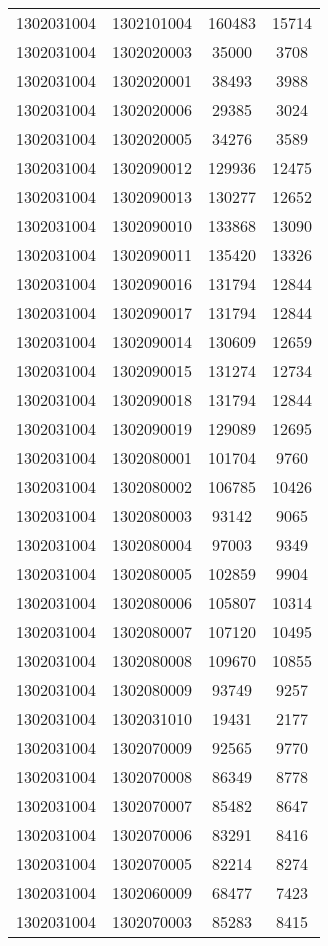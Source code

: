 \begin{longtable}{llcc}
1302031004 & 1302101004 & 160483 & 15714\\
1302031004 & 1302020003 & 35000 & 3708\\
1302031004 & 1302020001 & 38493 & 3988\\
1302031004 & 1302020006 & 29385 & 3024\\
1302031004 & 1302020005 & 34276 & 3589\\
1302031004 & 1302090012 & 129936 & 12475\\
1302031004 & 1302090013 & 130277 & 12652\\
1302031004 & 1302090010 & 133868 & 13090\\
1302031004 & 1302090011 & 135420 & 13326\\
1302031004 & 1302090016 & 131794 & 12844\\
1302031004 & 1302090017 & 131794 & 12844\\
1302031004 & 1302090014 & 130609 & 12659\\
1302031004 & 1302090015 & 131274 & 12734\\
1302031004 & 1302090018 & 131794 & 12844\\
1302031004 & 1302090019 & 129089 & 12695\\
1302031004 & 1302080001 & 101704 & 9760\\
1302031004 & 1302080002 & 106785 & 10426\\
1302031004 & 1302080003 & 93142 & 9065\\
1302031004 & 1302080004 & 97003 & 9349\\
1302031004 & 1302080005 & 102859 & 9904\\
1302031004 & 1302080006 & 105807 & 10314\\
1302031004 & 1302080007 & 107120 & 10495\\
1302031004 & 1302080008 & 109670 & 10855\\
1302031004 & 1302080009 & 93749 & 9257\\
1302031004 & 1302031010 & 19431 & 2177\\
1302031004 & 1302070009 & 92565 & 9770\\
1302031004 & 1302070008 & 86349 & 8778\\
1302031004 & 1302070007 & 85482 & 8647\\
1302031004 & 1302070006 & 83291 & 8416\\
1302031004 & 1302070005 & 82214 & 8274\\
1302031004 & 1302060009 & 68477 & 7423\\
1302031004 & 1302070003 & 85283 & 8415\\

\end{longtable}
